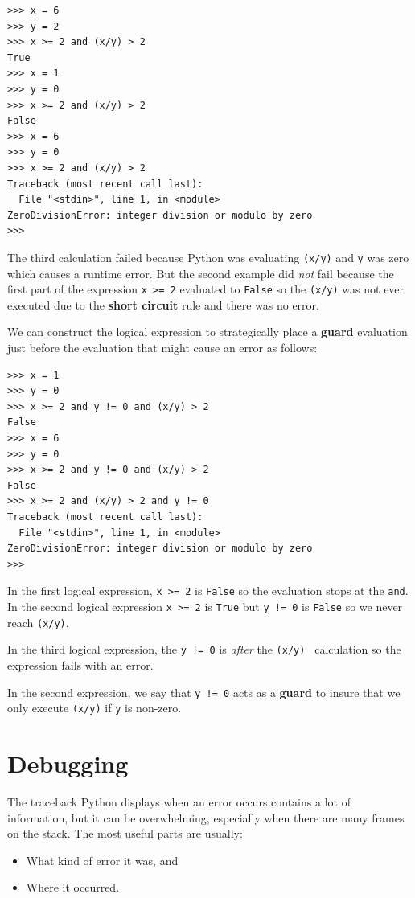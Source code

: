 \documentclass[10pt]{book}
\begin{document}
\beforeverb
\begin{verbatim}
>>> x = 6 
>>> y = 2
>>> x >= 2 and (x/y) > 2
True
>>> x = 1 
>>> y = 0
>>> x >= 2 and (x/y) > 2
False
>>> x = 6
>>> y = 0
>>> x >= 2 and (x/y) > 2
Traceback (most recent call last):
  File "<stdin>", line 1, in <module>
ZeroDivisionError: integer division or modulo by zero
>>> 
\end{verbatim}
\afterverb
%
The third calculation failed because Python was evaluating {\tt (x/y)}
and {\tt y} was zero which causes a runtime error.  But the second example
did {\em not} fail because the first part of the expression {\tt x >= 2} 
evaluated to {\tt False} so the {\tt (x/y)} was not ever executed 
due to the {\bf short circuit} rule and there was no error.

We can construct the logical expression to strategically place a {\bf guard}
evaluation just before the evaluation that might cause an error as follows:

\beforeverb
\begin{verbatim}
>>> x = 1
>>> y = 0
>>> x >= 2 and y != 0 and (x/y) > 2
False
>>> x = 6 
>>> y = 0
>>> x >= 2 and y != 0 and (x/y) > 2
False
>>> x >= 2 and (x/y) > 2 and y != 0
Traceback (most recent call last):
  File "<stdin>", line 1, in <module>
ZeroDivisionError: integer division or modulo by zero
>>>
\end{verbatim}
\afterverb
%
In the first logical expression, {\tt x >= 2} is {\tt False} so the evaluation
stops at the {\tt and}.  In the second logical expression {\tt x >= 2} is {\tt True}
but {\tt y != 0} is {\tt False} so we never reach {\tt (x/y)}.

In the third logical expression, the {\tt y != 0} is {\em after} the 
{\tt (x/y) } calculation so the expression fails with an error.

In the second expression, we say that {\tt y != 0} acts as a {\bf guard}
to insure that we only execute {\tt (x/y)} if {\tt y} is non-zero.


\section{Debugging}
\label{whitespace}

The traceback Python displays when an error occurs contains
a lot of information, but it can be overwhelming, especially
when there are many frames on the stack.  The most
useful parts are usually:

\begin{itemize}

\item What kind of error it was, and

\item Where it occurred.

\end{itemize}
\end{document}
